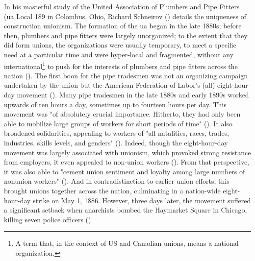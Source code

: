 \documentclass[12pt]{article}
\begin{document}
In his masterful study of the United Association of Plumbers and Pipe Fitters (\acrshort{ua} Local 189 in Colombus, Ohio, Richard Schneirov (\citeyear{schneirovPrideSolidarityHistory1993}) details the uniqueness of construction unionism. The formation of the \acrshort{ua} began in the late 1880s; before then, plumbers and pipe fitters were largely unorganized; to the extent that they did form unions, the organizations were usually temporary, to meet a specific need at a particular time and were hyper-local and fragmented, without any international\footnote{A term that, in the context of US and Canadian unions, means a national organization.} to push for the interests of plumbers and pipe fitters across the nation (\citeyear[58]{schneirovPrideSolidarityHistory1993}). The first boon for the pipe tradesmen was not an organizing campaign undertaken by the union but the American Federation of Labor’s (\acrshort{afl}) eight-hour-day movement (\citeyear[11, 43–45]{schneirovPrideSolidarityHistory1993}). Many pipe tradesmen in the late 1880s and early 1890s worked upwards of ten hours a day, sometimes up to fourteen hours per day. This movement was "of absolutely crucial importance. Hitherto, they had only been able to mobilize large groups of workers for short periods of time" (\citeyear[43–45]{schneirovPrideSolidarityHistory1993}). It also broadened solidarities, appealing to workers of "all natalities, races, trades, industries, skills levels, and genders" (\citeyear[43]{schneirovPrideSolidarityHistory1993}). Indeed, though the eight-hour-day movement was largely associated with unionism, which provoked strong resistance from employers, it even appealed to non-union workers (\citeyear[45]{schneirovPrideSolidarityHistory1993}). From that perspective, it was also able to "cement union sentiment and loyalty among large numbers of nonunion workers" (\citeyear[45]{schneirovPrideSolidarityHistory1993}). And in contradistinction to earlier union efforts, this brought unions together across the nation, culminating in a nation-wide eight-hour-day strike on May 1, 1886. However, three days later, the movement suffered a significant setback when anarchists bombed the Haymarket Square in Chicago, killing seven police officers (\citeyear[45]{schneirovPrideSolidarityHistory1993}).
\end{document}
